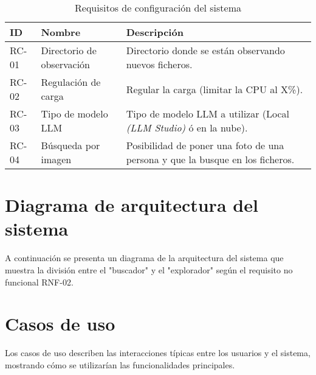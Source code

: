 \begin{table}[H]
\centering
\begin{tabular}{|p{1cm}|p{4cm}|p{9cm}|}
\hline
\textbf{ID} & \textbf{Nombre} & \textbf{Descripción} \\
\hline
RC-01 & Directorio de observación & Directorio donde se están observando nuevos ficheros. \\
\hline
RC-02 & Regulación de carga & Regular la carga (limitar la CPU al X\%). \\
\hline
RC-03 & Tipo de modelo LLM & Tipo de modelo LLM a utilizar (Local \textit{(LLM Studio)} ó en la nube). \\
\hline
RC-04 & Búsqueda por imagen & Posibilidad de poner una foto de una persona y que la busque en los ficheros. \\
\hline
\end{tabular}
\caption{Requisitos de configuración del sistema}
\label{tab:req_configuracion}
\end{table}

\section{Diagrama de arquitectura del sistema}
A continuación se presenta un diagrama de la arquitectura del sistema que muestra la división entre el "buscador" y el "explorador" según el requisito no funcional RNF-02.


\section{Casos de uso}
Los casos de uso describen las interacciones típicas entre los usuarios y el sistema, mostrando cómo se utilizarían las funcionalidades principales.

